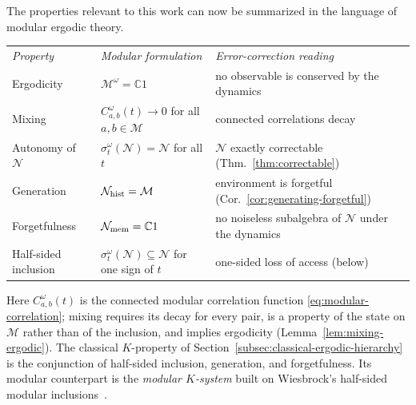 \documentclass[a4paper,11pt]{article}
\theoremstyle{definition}
\begin{document}
The properties relevant to this work can now be summarized in the language of modular ergodic theory.
\begin{center}
\begin{tabular}{lll}
 \textit{Property} & \textit{Modular formulation} & \textit{Error-correction reading}\\[4pt]
 Ergodicity & $\mathcal M^\omega=\mathbb C1$ & no observable is conserved by the dynamics\\
 Mixing & $C_{a,b}^\omega(t)\to0$ for all $a,b\in\mathcal M$ & connected correlations decay\\
 Autonomy of $\mathcal N$ & $\sigma^\omega_t(\mathcal N)=\mathcal N$ for all $t$ & $\mathcal N$ exactly correctable (Thm.~\ref{thm:correctable})\\
 Generation & $\mathcal N_{\rm hist}=\mathcal M$ & environment is forgetful (Cor.~\ref{cor:generating-forgetful})\\
 Forgetfulness & $\mathcal N_{\rm mem}=\mathbb C1$ & no noiseless subalgebra of $\mathcal N$ under the dynamics\\
 Half-sided inclusion & $\sigma^\omega_t(\mathcal N)\subseteq\mathcal N$ for one sign of $t$ & one-sided loss of access (below)
\end{tabular}
\end{center}
Here $C^\omega_{a,b}(t)$ is the connected modular correlation function \eqref{eq:modular-correlation}; mixing requires its decay for every pair, is a property of the state on $\mathcal M$ rather than of the inclusion, and implies ergodicity (Lemma~\ref{lem:mixing-ergodic}). The classical $K$-property of Section~\ref{subsec:classical-ergodic-hierarchy} is the conjunction of half-sided inclusion, generation, and forgetfulness. Its modular counterpart is the \emph{modular $K$-system} built on Wiesbrock's half-sided modular inclusions~\cite{Wiesbrock1993}.
\end{document}
